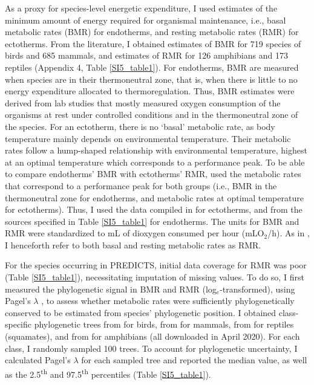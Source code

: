 As a proxy for species-level energetic expenditure, I used estimates of the minimum amount of energy required for organismal maintenance, i.e., basal metabolic rates (BMR) for endotherms, and resting metabolic rates (RMR) for ectotherms. From the literature, I obtained estimates of BMR for 719 species of birds and 685 mammals, and estimates of RMR for 126 amphibians and 173 reptiles (Appendix 4, Table \ref{SI5_table1}). For endotherms, BMR are measured when species are in their thermoneutral zone, that is, when there is little to no energy expenditure allocated to thermoregulation. Thus, BMR estimates were derived from lab studies that mostly measured oxygen consumption of the organisms at rest under controlled conditions and in the thermoneutral zone of the species. For an ectotherm, there is no `basal' metabolic rate, as body temperature mainly depends on environmental temperature. Their metabolic rates follow a hump-shaped relationship with environmental temperature, highest at an optimal temperature which corresponds to a performance peak. To be able to compare endotherms’ BMR with ectotherms’ RMR, \citet{Stark2020} used the metabolic rates that correspond to a performance peak for both groups (i.e., BMR in the thermoneutral zone for endotherms, and metabolic rates at optimal temperature for ectotherms). Thus, I used the data compiled in \citet{Stark2020} for ectotherms, and from the sources specified in Table \ref{SI5_table1} for endotherms. The units for BMR and RMR were standardized to mL of dioxygen consumed per hour (mLO$_2$/h). As in \citet{Stark2020}, I henceforth refer to both basal and resting metabolic rates as RMR. 

For the species occurring in PREDICTS, initial data coverage for RMR was poor (Table \ref{SI5_table1}), necessitating imputation of missing values. To do so, I first measured the phylogenetic signal in BMR and RMR (log$_e$-transformed), using Pagel’s $\lambda$ \citep{Pagel1999}, to assess whether metabolic rates were sufficiently phylogenetically conserved to be estimated from species' phylogenetic position. I obtained class-specific phylogenetic trees from \citet{Jetz2012} for birds, from \citet{Faurby2018, Faurby2020} for mammals, from \citep{Tonini2016} for reptiles (squamates), and from \citet{Jetz2018} for amphibians (all downloaded in April 2020). For each class, I randomly sampled 100 trees. To account for phylogenetic uncertainty, I calculated Pagel’s $\lambda$ for each sampled tree and reported the median value, as well as the 2.5\textsuperscript{th} and 97.5\textsuperscript{th} percentiles (Table \ref{SI5_table1}).  

